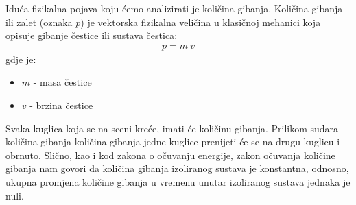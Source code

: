 Iduća fizikalna pojava koju ćemo analizirati je količina gibanja. Količina gibanja ili zalet (oznaka $p$) je vektorska fizikalna veličina u klasičnoj mehanici koja opisuje gibanje čestice ili sustava čestica\cite{12}:
\begin{equation}\label{equ:impuls}
\begin{aligned}
	p = m \ v
\end{aligned}
\end{equation}
gdje je:
\begin{itemize}
	\item $m$ - masa čestice
	\item $v$ - brzina čestice
\end{itemize}
Svaka kuglica koja se na sceni kreće, imati će količinu gibanja. Prilikom sudara količina gibanja količina gibanja jedne kuglice prenijeti će se na drugu kuglicu i obrnuto. Slično, kao i kod zakona o očuvanju energije, zakon očuvanja količine gibanja nam govori da količina gibanja izoliranog sustava je konstantna, odnosno, ukupna promjena količine gibanja u vremenu unutar izoliranog sustava jednaka je nuli\cite{12}.

